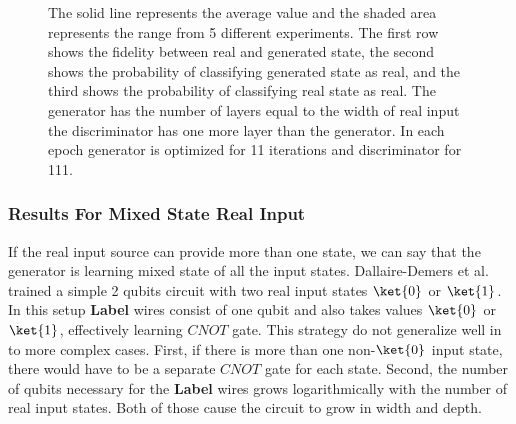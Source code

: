 \begin{figure}[htbp!]
  \caption{The solid line represents the average value and the shaded area
    represents the range from 5 different experiments. The first row shows the fidelity
    between real and generated state, the second shows the probability of
    classifying generated state as real, and the third shows the probability of
    classifying real state as real. The generator has the
    number of layers equal to the width of real input the discriminator has one
    more layer than the generator. In each epoch generator is optimized for 11 iterations and
  discriminator for 111. }
  \label{fig:sqgans_res_3}
\end{figure}
\subsubsection{Results For Mixed State Real Input}
If the real input source can provide more than one state, we can say that the
generator is learning mixed state of all the input states. Dallaire-Demers et
al. \cite{Dallaire_Demers_2018} trained a simple 2 qubits circuit with two real
input states $\ket{0}$ or $\ket{1}$. In this setup \textbf{Label} wires consist
of one qubit and also takes values $\ket{0}$ or $\ket{1}$, effectively learning
$CNOT$ gate. This strategy do not generalize well in to more complex cases.
First, if there is more than one non-$\ket{0}$ input state, there would have to
be a separate $CNOT$ gate for each state. Second, the number of qubits necessary
for the \textbf{Label} wires grows logarithmically with the number of real input
states. Both of those cause the circuit to grow in width and depth.


